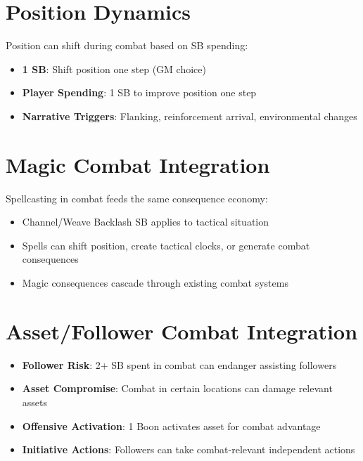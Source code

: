 \section{Position Dynamics}
Position can shift during combat based on SB spending:
\begin{itemize}
    \item \textbf{1 SB}: Shift position one step (GM choice)
    \item \textbf{Player Spending}: 1 SB to improve position one step
    \item \textbf{Narrative Triggers}: Flanking, reinforcement arrival, environmental changes
\end{itemize}

\section{Magic Combat Integration}
Spellcasting in combat feeds the same consequence economy:
\begin{itemize}
    \item Channel/Weave Backlash SB applies to tactical situation
    \item Spells can shift position, create tactical clocks, or generate combat consequences
    \item Magic consequences cascade through existing combat systems
\end{itemize}

\section{Asset/Follower Combat Integration}
\begin{itemize}
    \item \textbf{Follower Risk}: 2+ SB spent in combat can endanger assisting followers
    \item \textbf{Asset Compromise}: Combat in certain locations can damage relevant assets  
    \item \textbf{Offensive Activation}: 1 Boon activates asset for combat advantage
    \item \textbf{Initiative Actions}: Followers can take combat-relevant independent actions
\end{itemize}

